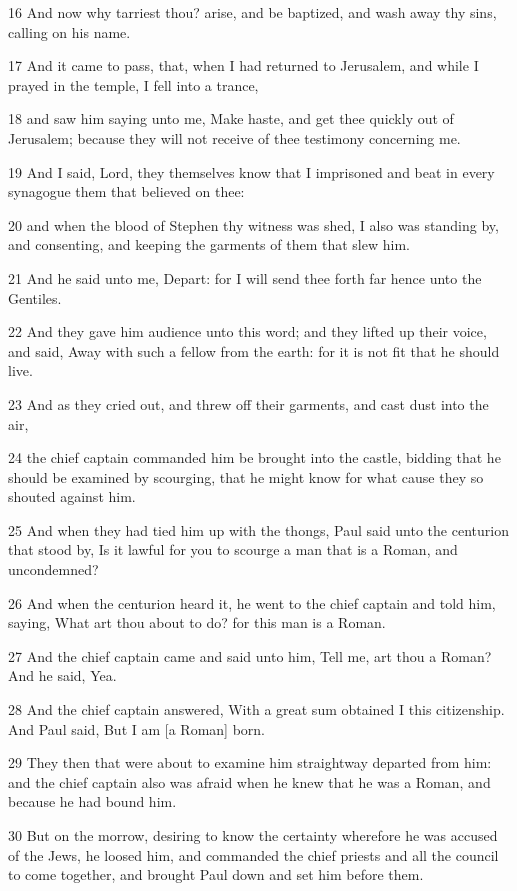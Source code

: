 \par 16 And now why tarriest thou? arise, and be baptized, and wash away thy sins, calling on his name.
\par 17 And it came to pass, that, when I had returned to Jerusalem, and while I prayed in the temple, I fell into a trance,
\par 18 and saw him saying unto me, Make haste, and get thee quickly out of Jerusalem; because they will not receive of thee testimony concerning me.
\par 19 And I said, Lord, they themselves know that I imprisoned and beat in every synagogue them that believed on thee:
\par 20 and when the blood of Stephen thy witness was shed, I also was standing by, and consenting, and keeping the garments of them that slew him.
\par 21 And he said unto me, Depart: for I will send thee forth far hence unto the Gentiles.
\par 22 And they gave him audience unto this word; and they lifted up their voice, and said, Away with such a fellow from the earth: for it is not fit that he should live.
\par 23 And as they cried out, and threw off their garments, and cast dust into the air,
\par 24 the chief captain commanded him be brought into the castle, bidding that he should be examined by scourging, that he might know for what cause they so shouted against him.
\par 25 And when they had tied him up with the thongs, Paul said unto the centurion that stood by, Is it lawful for you to scourge a man that is a Roman, and uncondemned?
\par 26 And when the centurion heard it, he went to the chief captain and told him, saying, What art thou about to do? for this man is a Roman.
\par 27 And the chief captain came and said unto him, Tell me, art thou a Roman? And he said, Yea.
\par 28 And the chief captain answered, With a great sum obtained I this citizenship. And Paul said, But I am [a Roman] born.
\par 29 They then that were about to examine him straightway departed from him: and the chief captain also was afraid when he knew that he was a Roman, and because he had bound him.
\par 30 But on the morrow, desiring to know the certainty wherefore he was accused of the Jews, he loosed him, and commanded the chief priests and all the council to come together, and brought Paul down and set him before them.

